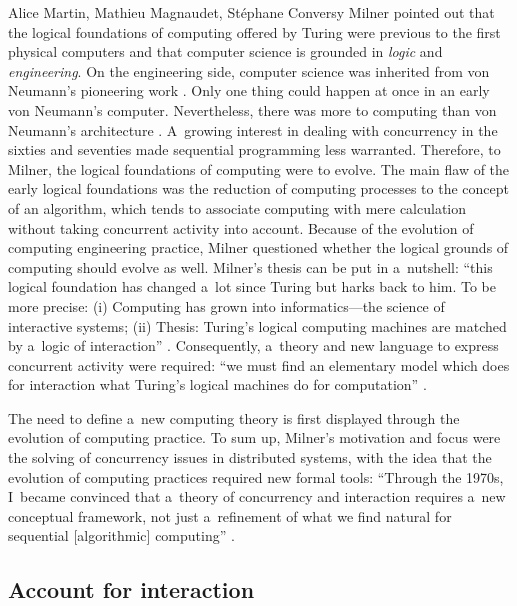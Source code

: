 \begin{artengenv2auth}{Alice Martin, Mathieu Magnaudet, Stéphane Conversy}
Milner \parencite*{Milner2006} pointed out  that the logical foundations of computing offered by Turing \parencite*{Turing1937} were previous to the first physical computers and that computer science is grounded in \emph{logic} and \emph{engineering}. On the engineering side, computer science was inherited from von Neumann’s pioneering work \parencite{Godfrey1993, Aspray1990}. Only one thing could happen at once in an early von Neumann's computer. Nevertheless, there was more to computing than von Neumann's architecture \parencite{Backus1978, Milner2006}. A~growing interest in dealing with concurrency in the sixties and seventies made sequential programming less warranted. Therefore, to Milner, the logical foundations of computing were to evolve. The main flaw of the early logical foundations was the reduction of computing processes to the concept of an algorithm, which tends to associate computing with mere calculation without taking concurrent activity into account. Because of the evolution of computing engineering practice, Milner questioned whether the logical grounds of computing should evolve as well. Milner's thesis can be put in a~nutshell: ``this logical foundation has changed a~lot since Turing but harks back to him. To be more precise: (i) Computing has grown into informatics---the science of interactive systems; (ii) Thesis: Turing's logical computing machines are matched by a~logic of interaction'' \parencite{Milner2006}. Consequently, a~theory and new language to express concurrent activity were required: ``we must find an elementary model which does for interaction what Turing's logical machines do for computation'' \parencite{Milner2006}. 

The need to define a~new computing theory is first displayed through the evolution of computing practice.
To sum up, Milner’s motivation and focus were the solving of concurrency issues in distributed systems, with the idea that the evolution of computing practices required new formal tools: ``Through the 1970s, I~became convinced that a~theory of concurrency and interaction requires a~new conceptual framework, not just a~refinement of what we find natural for sequential [algorithmic] computing'' \parencite{Milner1993}. 

\subsection{Account for interaction}


\end{artengenv2auth}
